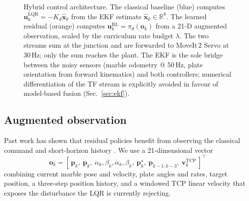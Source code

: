 \documentclass[conference]{IEEEtran}
\newcommand{\R}{\mathbb{R}}
\begin{document}
\begin{figure}[t]
\caption{Hybrid control architecture. The classical baseline (blue) computes
$\bm{u}^{\text{LQR}}_k=-K_d\hat{\bm{x}}_k$ from the EKF estimate
$\hat{\bm{x}}_k\in\R^8$. The learned residual (orange) computes
$\bm{u}^{\text{RL}}_k=\pi_\theta(\bm{o}_k)$ from a 21-D augmented
observation, scaled by the curriculum rate budget $\lambda$. The two streams sum at the
junction and are forwarded to MoveIt\,2 Servo at 30\,Hz; only the sum
reaches the plant. The EKF is the sole bridge between the noisy sensors
(marble odometry @ 50\,Hz, plate orientation from forward kinematics)
and both controllers; numerical differentiation of the TF stream is
explicitly avoided in favour of model-based fusion (Sec.~\ref{sec:ekf}).}
\label{fig:arch}
\end{figure}

\subsection{Augmented observation}
Past work has shown that residual policies benefit from observing the
classical command \cite{Johannink2019} and short-horizon history
\cite{Hausknecht2015}. We use a 21-dimensional vector
\begin{equation}
\bm{o}_k = [\,\bm{p}_k,\ \dot{\bm{p}}_k,\ \alpha_k,\beta_k,\dot\alpha_k,\dot\beta_k,\ \bm{p}^\star_k,\ \bm{p}_{k-1{:}k-3},\ \bm{v}^{\text{TCP}}_k\,]^\top
\end{equation}
combining current marble pose and velocity, plate angles and rates, target
position, a three-step position history, and a windowed TCP linear velocity
that exposes the disturbance the LQR is currently rejecting.
\end{document}
